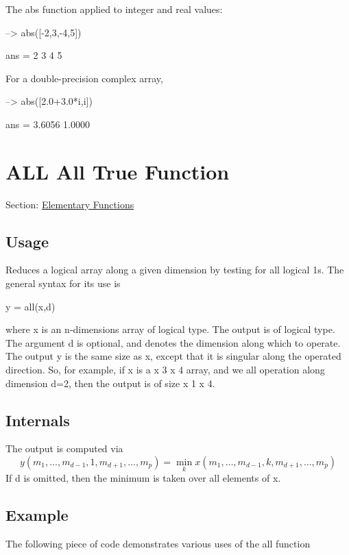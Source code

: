 The {\ttfamily abs} function applied to integer and real values\-:


\begin{DoxyVerbInclude}
--> abs([-2,3,-4,5])

ans = 
 2 3 4 5 
\end{DoxyVerbInclude}


For a double-\/precision complex array,


\begin{DoxyVerbInclude}
--> abs([2.0+3.0*i,i])

ans = 
    3.6056    1.0000 
\end{DoxyVerbInclude}
 \hypertarget{elementary_all}{}\section{A\-L\-L All True Function}\label{elementary_all}
Section\-: \hyperlink{sec_elementary}{Elementary Functions} \hypertarget{vtkwidgets_vtkxyplotwidget_Usage}{}\subsection{Usage}\label{vtkwidgets_vtkxyplotwidget_Usage}
Reduces a logical array along a given dimension by testing for all logical 1s. The general syntax for its use is \begin{DoxyVerb}  y = all(x,d)
\end{DoxyVerb}
 where {\ttfamily x} is an {\ttfamily n}-\/dimensions array of {\ttfamily logical} type. The output is of {\ttfamily logical} type. The argument {\ttfamily d} is optional, and denotes the dimension along which to operate. The output {\ttfamily y} is the same size as {\ttfamily x}, except that it is singular along the operated direction. So, for example, if {\ttfamily x} is a { x 3 x 4} array, and we {\ttfamily all} operation along dimension {\ttfamily d=2}, then the output is of size { x 1 x 4}. \hypertarget{transforms_svd_Function}{}\subsection{Internals}\label{transforms_svd_Function}
The output is computed via \[ y(m_1,\ldots,m_{d-1},1,m_{d+1},\ldots,m_{p}) = \min_{k} x(m_1,\ldots,m_{d-1},k,m_{d+1},\ldots,m_{p}) \] If {\ttfamily d} is omitted, then the minimum is taken over all elements of {\ttfamily x}. \hypertarget{variables_struct_Example}{}\subsection{Example}\label{variables_struct_Example}
The following piece of code demonstrates various uses of the {\ttfamily all} function


